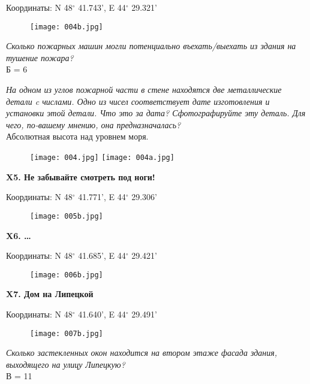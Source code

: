 \documentclass[pscyr,titlepage]{hedreport}
\begin{document}
  Координаты: N 48\( ^\circ \) 41.743', E 44\( ^\circ \) 29.321'

  \begin{figure}[htbp]
    \center
    \texttt{[image: 004b.jpg]}
  \end{figure}

  \emph{Сколько пожарных машин могли потенциально въехать/выехать из здания на
  тушение пожара?} \\
  Б = 6

  \emph{На одном из углов пожарной части в стене находятся две металлические
  детали c числами. Одно из чисел соответствует дате изготовления и установки
  этой детали. Что это за дата? Сфотографируйте эту деталь. Для чего, по-вашему
  мнению, она предназначалась?} \\  
  Абсолютная высота над уровнем моря.

  \begin{figure}[htbp]
    \center
    \texttt{[image: 004.jpg]} \hfill
    \texttt{[image: 004a.jpg]}
  \end{figure}

  \pagebreak

  \textbf{X5. Не забывайте смотреть под ноги!}

  Координаты: N 48\( ^\circ \) 41.771', E 44\( ^\circ \) 29.306'

  \begin{figure}[htbp]
    \center
    \texttt{[image: 005b.jpg]}
  \end{figure}

  \pagebreak

  \textbf{X6. \ldots}

  Координаты: N 48\( ^\circ \) 41.685', E 44\( ^\circ \) 29.421'

  \begin{figure}[htbp]
    \center
    \texttt{[image: 006b.jpg]}
  \end{figure}

  \pagebreak

  \textbf{X7. Дом на Липецкой}

  Координаты: N 48\( ^\circ \) 41.640', E 44\( ^\circ \) 29.491'

  \begin{figure}[htbp]
    \center
    \texttt{[image: 007b.jpg]}
  \end{figure}

  \emph{Сколько застекленных окон находится на втором этаже фасада здания, 
  выходящего на улицу Липецкую?} \\
  В = 11
\end{document}
